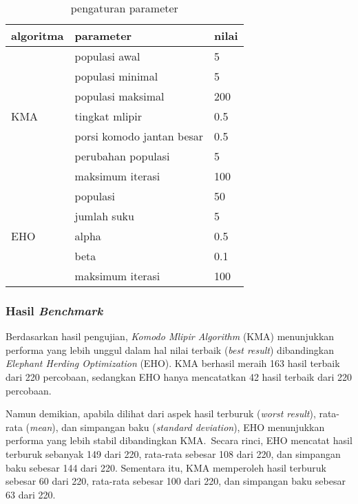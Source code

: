 \begin{table}[h!]
\centering
\caption{pengaturan parameter}
\label{tab:pengaturan-parameter}
\begin{tabular}{|l|l|l|}
\hline
algoritma            & parameter                 & nilai \\ \hline
\multirow[t]{7}{*}{KMA} & populasi awal             & 5     \\ \cline{2-3} 
                     & populasi minimal          & 5     \\ \cline{2-3} 
                     & populasi maksimal         & 200   \\ \cline{2-3} 
                     & tingkat mlipir            & 0.5   \\ \cline{2-3} 
                     & porsi komodo jantan besar & 0.5   \\ \cline{2-3} 
                     & perubahan populasi        & 5     \\ \cline{2-3} 
                     & maksimum iterasi          & 100   \\ \hline
\multirow[t]{5}{*}{EHO} & populasi                  & 50    \\ \cline{2-3} 
                     & jumlah suku               & 5     \\ \cline{2-3} 
                     & alpha                     & 0.5   \\ \cline{2-3} 
                     & beta                      & 0.1   \\ \cline{2-3} 
                     & maksimum iterasi          & 100   \\ \hline
\end{tabular}
\end{table}

\subsubsection{Hasil \textit{Benchmark}}
Berdasarkan hasil pengujian, \textit{Komodo Mlipir Algorithm} (KMA) menunjukkan performa yang lebih unggul dalam hal nilai terbaik (\textit{best result}) dibandingkan \textit{Elephant Herding Optimization} (EHO). KMA berhasil meraih 163 hasil terbaik dari 220 percobaan, sedangkan EHO hanya mencatatkan 42 hasil terbaik dari 220 percobaan.

Namun demikian, apabila dilihat dari aspek hasil terburuk (\textit{worst result}), rata-rata (\textit{mean}), dan simpangan baku (\textit{standard deviation}), EHO menunjukkan performa yang lebih stabil dibandingkan KMA.\ Secara rinci, EHO mencatat hasil terburuk sebanyak 149 dari 220, rata-rata sebesar 108 dari 220, dan simpangan baku sebesar 144 dari 220. Sementara itu, KMA memperoleh hasil terburuk sebesar 60 dari 220, rata-rata sebesar 100 dari 220, dan simpangan baku sebesar 63 dari 220.

